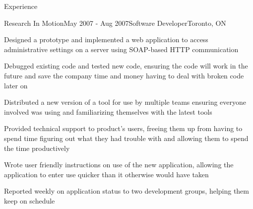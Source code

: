 \documentclass{resume}
\begin{document}
\begin{rSection}{Experience}
    \begin{rSubsection}{Research In Motion}{May 2007 - Aug 2007}{Software Developer}{Toronto, ON}
      \item Designed a prototype and implemented a web application to access administrative settings on a server using SOAP-based HTTP communication
      \item Debugged existing code and tested new code, ensuring the code will work in the future and save the company time and money having to deal with broken code later on
      \item Distributed a new version of a tool for use by multiple teams ensuring everyone involved was using and familiarizing themselves with the latest tools
      \item Provided technical support to product’s users, freeing them up from having to spend time figuring out what they had trouble with and allowing them to spend the time productively
      \item Wrote user friendly instructions on use of the new application, allowing the application to enter use quicker than it otherwise would have taken 
      \item Reported weekly on application status to two development groups, helping them keep on schedule
    \end{rSubsection}

\begin{comment}
    \begin{rSubsection}{Artificial Perception Laboratory (APL)}{May 2007 - Aug 2007}{Team Lead}{Toronto, ON}
      \item Conducted a broad range of projects to help further APL’s research, advancing APLs position in the industry
      \item Led a team of five volunteer students, delivering instructions on a weekly basis and gathering progress reports
      \item Reported weekly to coordinator and other team leaders allowing the different teams to complement each other's productivity
    \end{rSubsection}
\end{comment}

\begin{comment}
    \begin{rSubsection}{Rent Magic}{May 2006 - Aug 2006}{Software Developer}{Toronto, ON}
      \item Designed and implemented a PDA based front end and server backend to interact with a MySQL database producing a valuable product for Rent Magic
      \item Designed API structure, application structure and UI layout, data protocol creating a framework that can be used in the future for many other projects
      \item Kept supervisor up to date on progress and impediments, keeping the project on schedule
      \item Tested application, ensuring maximum customer satisfaction
    \end{rSubsection}
\end{comment}


\end{rSection}
\end{document}
